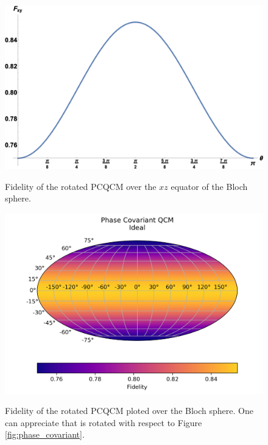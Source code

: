 \begin{figure}[H]
\centering
    \begin{minipage}[t]{.5\textwidth}
        \centering
        \includegraphics[width=\textwidth]{Figures/plot_1D_phase_covariant_different_labels.png}
        \label{fig:phase_covariant_rotated_1d}
        \caption{Fidelity of the rotated PCQCM over the $xz$ equator of the Bloch sphere.}
    \end{minipage}%
    \begin{minipage}[t]{.5\textwidth}
        \centering
        \includegraphics[width=\textwidth]{Figures/phase_covariant_rotated.png}
        \label{fig:phase_covariant_rotated}
        \caption{Fidelity of the rotated PCQCM ploted over the Bloch sphere. One can appreciate that is rotated with respect to Figure \ref{fig:phase_covariant}.}
    \end{minipage}
\end{figure}

